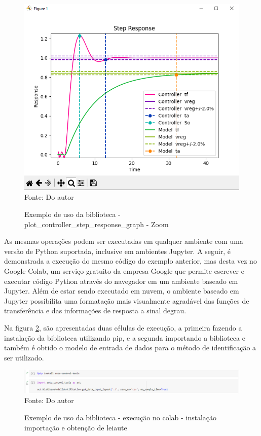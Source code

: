 \begin{figure}[H]
    \centering
    \caption{Exemplo de uso da biblioteca - plot\_controller\_step\_response\_graph - Zoom}
    \includegraphics[scale=0.6]{figuras/get_controller_plot_zoom}
    \label{fig:get_controller_plot_zoom}
    \\
    \vspace{0cm}\hspace{0cm}\small{Fonte: Do autor}
\end{figure}

As mesmas operações podem ser executadas em qualquer ambiente com uma versão de Python suportada, inclusive em
ambientes Jupyter.
A seguir, é demonstrada a execução do mesmo código do exemplo anterior, mas desta vez no Google Colab,
um serviço gratuito da empresa Google que permite escrever e executar código Python através do navegador em um ambiente
baseado em Jupyter.
Além de estar sendo executado em nuvem, o ambiente baseado em Jupyter possibilita uma formatação mais visualmente
agradável das funções de transferência e das informações de resposta a sinal degrau.

Na figura \ref{fig:colab_example1}, são apresentadas duas células de execução, a primeira fazendo a instalação da
biblioteca utilizando pip, e a segunda importando a biblioteca e também é obtido o modelo de entrada de dados para
o método de identificação a ser utilizado.

\begin{figure}[H]
    \centering
    \caption{Exemplo de uso da biblioteca - execução no colab - instalação importação e obtenção de leiaute}
    \includegraphics[scale=0.5]{figuras/colab_example1}
    \label{fig:colab_example1}
    \\
    \vspace{0cm}\hspace{0cm}\small{Fonte: Do autor}
\end{figure}

